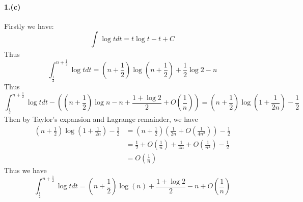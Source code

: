 \documentclass{article}
\begin{document}
\paragraph[short]{1.(c)}
{Firstly we have:
$$  \int_{}^{}\log t dt=t\log t-t+C$$
Thus $$\int_{\frac{1}{2}}^{n+\frac{1}{2}}\log t dt=
(n+\frac{1}{2})\log(n+\frac{1}{2})+\frac{1}{2}\log2-n$$
Thus
$$\int_{\frac{1}{2}}^{n+\frac{1}{2}}\log t dt-\left((n+\frac{1}{2})\log n
-n+\frac{1+\log 2}{2}+O(\frac{1}{n})\right)=(n+\frac{1}{2})\log (1+\frac{1}{2n})-\frac{1}{2}$$
Then by Taylor's expansion and Lagrange remainder, we have
\begin{align*}
    (n+\frac{1}{2})\log (1+\frac{1}{2n})-\frac{1}{2}&=(n+\frac{1}{2})(\frac{1}{2n}+O(\frac{1}{4n^2}))-\frac{1}{2}\\
    &=\frac{1}{2}+O(\frac{1}{n})+\frac{1}{4n}+O(\frac{1}{n^2})-\frac{1}{2}\\
    &=O(\frac{1}{n})
\end{align*}
Thus we have
$$\int_{\frac{1}{2}}^{n+\frac{1}{2}}\log t dt=
(n+\frac{1}{2})\log(n)+\frac{1+\log 2}{2}-n+O(\frac{1}{n})$$
}
\end{document}
